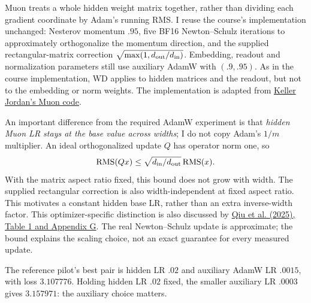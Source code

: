 \documentclass{article}
\begin{document}
Muon treats a whole hidden weight matrix together, rather than dividing
each gradient coordinate by Adam's running RMS. I reuse the course's
implementation unchanged: Nesterov momentum $.95$, five BF16
Newton--Schulz iterations to approximately orthogonalize the momentum
direction, and the supplied rectangular-matrix correction
$\sqrt{\max(1,d_{\rm out}/d_{\rm in})}$. Embedding, readout and
normalization parameters still use auxiliary AdamW with $(.9,.95)$.
As in the course implementation, WD applies to hidden matrices and the
readout, but not to the embedding or norm weights.
The implementation is adapted from
\href{https://github.com/KellerJordan/Muon/tree/f98f1cacc0263b04290753e32be8d498c1efc806}{Keller Jordan's Muon code}.

An important difference from the required AdamW experiment is that
\emph{hidden Muon LR stays at the base value across widths}; I do not
copy Adam's $1/m$ multiplier. An ideal orthogonalized update $Q$ has
operator norm one, so
\[
\operatorname{RMS}(Qx)\leq
\sqrt{d_{\rm in}/d_{\rm out}}\operatorname{RMS}(x).
\]
With the matrix aspect ratio fixed, this bound does not grow with width.
The supplied rectangular correction is also width-independent at fixed
aspect ratio. This motivates a constant hidden base LR, rather than an
extra inverse-width factor. This optimizer-specific distinction is
also discussed by
\href{https://proceedings.neurips.cc/paper_files/paper/2025/file/bdcd9f6327db5877dee502cdec183159-Paper-Conference.pdf}{Qiu et al. (2025), Table 1 and Appendix G}.
The real Newton--Schulz update is approximate; the bound explains the
scaling choice, not an exact guarantee for every measured update.

The reference pilot's best pair is hidden LR $.02$ and auxiliary AdamW
LR $.0015$, with loss $3.107776$. Holding hidden LR $.02$ fixed, the
smaller auxiliary LR $.0003$ gives $3.157971$: the auxiliary choice matters.
\end{document}
